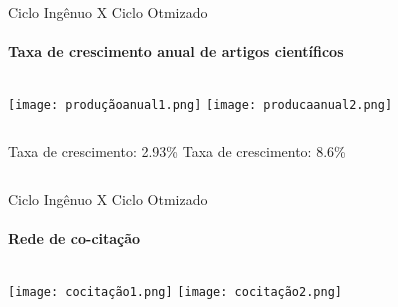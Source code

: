 
\begin{frame}[t]{Ciclo Ingênuo X Ciclo Otmizado}
    \transboxout[duration=0.5]
    \framesubtitle{Taxa de crescimento anual de artigos científicos}
    
    \begin{columns}
        \newline  
            \texttt{[image: produçãoanual1.png]}
        \newline  
         \texttt{[image: producaanual2.png]}
    \end{columns}
    
    \begin{columns}
        \newline  
        Taxa de crescimento: 2.93\%
        \newline
         Taxa de crescimento: 8.6\%
    \end{columns}
\end{frame}
\begin{frame}[t]{Ciclo Ingênuo X Ciclo Otmizado}
    \transboxout[duration=0.5]
    \framesubtitle{Rede de co-citação}
    
    \begin{columns}
        \newline  
            \texttt{[image: cocitação1.png]}
        \newline  
         \texttt{[image: cocitação2.png]}
    \end{columns}
    
\end{frame}
